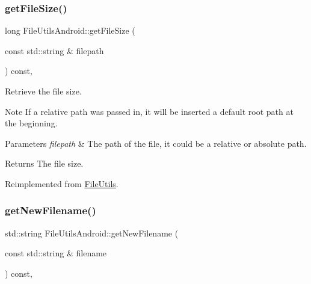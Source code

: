 \subsubsection{\texorpdfstring{get\+File\+Size()}{getFileSize()}}
{\footnotesize\ttfamily long File\+Utils\+Android\+::get\+File\+Size (\begin{DoxyParamCaption}\item[{const std\+::string \&}]{filepath }\end{DoxyParamCaption}) const\hspace{0.3cm}{\ttfamily [override]}, {\ttfamily [virtual]}}

Retrieve the file size.

\begin{DoxyNote}{Note}
If a relative path was passed in, it will be inserted a default root path at the beginning. 
\end{DoxyNote}

\begin{DoxyParams}{Parameters}
{\em filepath} & The path of the file, it could be a relative or absolute path. \\
\hline
\end{DoxyParams}
\begin{DoxyReturn}{Returns}
The file size. 
\end{DoxyReturn}


Reimplemented from \hyperlink{classFileUtils_acba4a8730094e74096bfe4cede7f0315}{File\+Utils}.

\mbox{\label{classFileUtilsAndroid_a57440532823c7b9f5807457fef15b978}} 
\subsubsection{\texorpdfstring{get\+New\+Filename()}{getNewFilename()}\hspace{0.1cm}{\footnotesize\ttfamily [1/2]}}
{\footnotesize\ttfamily std\+::string File\+Utils\+Android\+::get\+New\+Filename (\begin{DoxyParamCaption}\item[{const std\+::string \&}]{filename }\end{DoxyParamCaption}) const\hspace{0.3cm}{\ttfamily [override]}, {\ttfamily [virtual]}}

